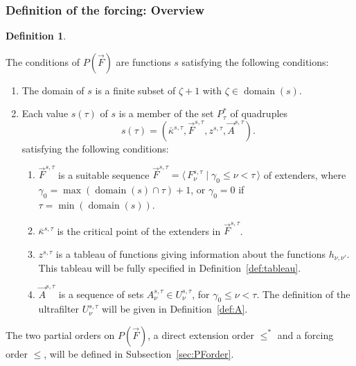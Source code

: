 \documentclass[
twoside,
]{article}
\theoremstyle{definition}
\newtheorem{definition}[theorem]{Definition}
\theoremstyle{remark}
\newcommand{\forceKappa}{\bar\kappa} %
\newcommand{\pair}[1]{\langle#1\rangle}
\newcommand{\seq}[1]{\pair{\,#1\,}}
\DeclareMathOperator{\domain}{domain}
\begin{document}
\subsubsection{Definition of the forcing: Overview}
\begin{definition}\label{def:overview}

The conditions of $P(\vec F)$ are functions $s$ satisfying the
following conditions:
\begin{enumerate}
    \item The domain of $s$ is a finite subset of $\zeta+1$ with $\zeta\in\domain(s)$.
    \item Each value $s(\tau)$ of $s$ is a  member of  the set $P^*_\tau$
      of  quadruples 
    \begin{equation*}
s(\tau)=(\forceKappa^{s,\tau},\vec F^{s,\tau},z^{s,\tau},\vec
A^{s,\tau}).
\end{equation*}
 satisfying the following conditions:
\begin{enumerate}
    \item $\vec F^{s,\tau}$ is a suitable sequence  $\vec F^{s,\tau}=\seq{F^{s,\tau}_{\nu}\mid
  \gamma_0\leq\nu<\tau}$ of extenders, where
$\gamma_0=\max(\domain(s)\cap \tau)+1$, or $\gamma_0=0$
if $\tau=\min(\domain(s))$.
\item 
 $\forceKappa^{s,\tau}$ is the critical point of the extenders in $\vec F^{s,\tau}$.
 \item $z^{s,\tau}$ is a tableau of functions giving information about
   the functions $h_{\nu,\nu'}$.  This tableau will  be fully
   specified in Definition~\ref{def:tableau}. 
 \item $\vec A^{s,\tau}$ is a sequence of sets $A^{s,\tau}_\nu\in
   U^{s,\tau}_\nu$, for $\gamma_0\le\nu<\tau$.  The definition of the ultrafilter 
    $U^{s,\tau}_\nu$ will be given in  Definition~\ref{def:A}.  
\end{enumerate}
\end{enumerate}

The two partial orders on $P(\vec F)$,  a direct extension order
$\le^*$ and a forcing
order $\le$, will be defined in Subsection~\ref{sec:PForder}. 
\end{definition}
\end{document}
